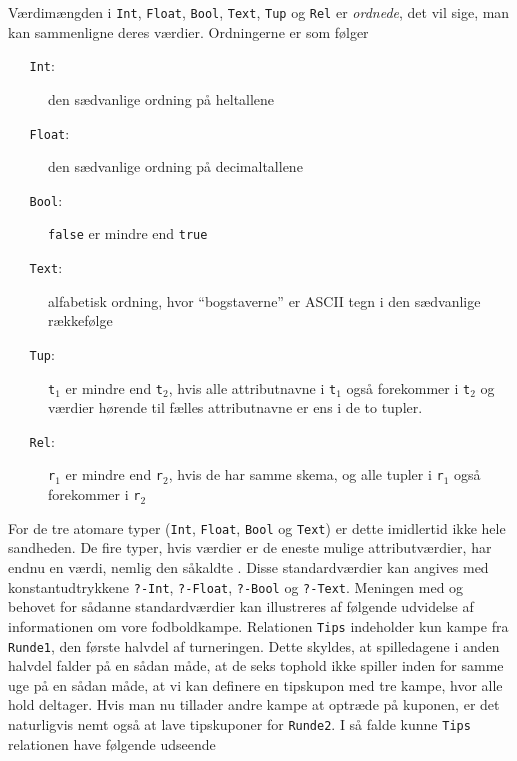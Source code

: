 \documentclass{article}
\newcounter{eks}
\begin{document}
V\ae{}rdim\ae{}ngden i \verb"Int", \verb"Float", \verb"Bool", \verb"Text", \verb"Tup" og
\verb"Rel" er {\em ordnede}, det vil sige, man kan sammenligne deres
v\ae{}rdier. Ordningerne er som f\o{}lger
\begin{description}%
\item[{\tt ~~~Int}:] den s\ae{}dvanlige ordning p\aa{} heltallene
\item[{\tt ~~~Float}:] den s\ae{}dvanlige ordning p\aa{} decimaltallene
\item[{\tt ~~~Bool}:] \verb"false" er mindre end \verb"true"
\item[{\tt ~~~Text}:] alfabetisk ordning, hvor ``bogstaverne'' er ASCII tegn
i den s\ae{}dvanlige r\ae{}kkef\o{}lge
\item[{\tt ~~~Tup}:] {\tt t$_1$} er mindre end {\tt t$_2$}, hvis alle attributnavne
i {\tt t$_1$} ogs\aa{} forekommer i {\tt t$_2$} og v\ae{}rdier h\o{}rende
til f\ae{}lles attributnavne er ens i de to tupler. 
\item[{\tt ~~~Rel}:] {\tt r$_1$} er mindre end {\tt r$_2$}, hvis 
de har samme skema, og alle tupler i {\tt r$_1$} ogs\aa{} 
forekommer i {\tt r$_2$}
\end{description}
For de tre atomare typer (\verb"Int", \verb"Float", \verb"Bool" og \verb"Text")
er dette imidlertid ikke hele sandheden. De fire typer, hvis
v\ae{}rdier er de eneste mulige attributv\ae{}rdier, har endnu en v\ae{}rdi,
nemlig den s\aa{}kaldte {\em {}}. Disse 
standardv\ae{}rdier kan angives
med konstantudtrykkene \verb"?-Int", \verb"?-Float", \verb"?-Bool" og \verb"?-Text".
Meningen med og behovet for s\aa{}danne standardv\ae{}rdier kan
illustreres af f\o{}lgende udvidelse af informationen om vore
fodboldkampe. Relationen
\verb"Tips" indeholder kun kampe fra \verb"Runde1", den f\o{}rste halvdel af 
turneringen. Dette skyldes, at spilledagene i anden halvdel falder
p\aa{} en s\aa{}dan m\aa{}de, at de seks tophold ikke spiller
inden for samme uge p\aa{} en s\aa{}dan m\aa{}de, at vi kan
definere en tipskupon med tre kampe, hvor alle hold deltager.
Hvis man nu tillader andre kampe at optr\ae{}de p\aa{} kuponen, er det
naturligvis nemt ogs\aa{} at lave tipskuponer for \verb"Runde2".
I s\aa{} falde kunne \verb"Tips" relationen have f\o{}lgende udseende
\begin{center}
\end{center}
\end{document}
